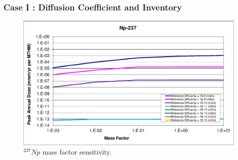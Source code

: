 
\begin{frame}[c]
  \frametitle{Case I : Diffusion Coefficient and Inventory}

\begin{figure}[ht!]
\centering
\includegraphics[width=\linewidth]{DiffCoeffAndInvEBSFail/Np-237-MF.eps}
\caption{$^{237}Np$ mass factor sensitivity.}
\label{fig:DCInvNp237MF}
\end{figure}
\end{frame}
